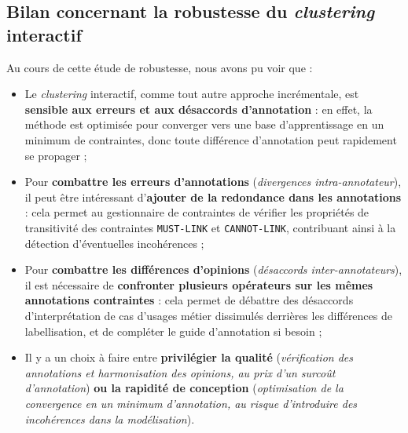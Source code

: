	
	\subsection{Bilan concernant la robustesse du \textit{clustering} interactif}
	\label{section:4.6.4-ETUDE-ROBUSTESSE-MISE-EN-COMMUN}
	
		\begin{leftBarSummary}
			Au cours de cette étude de robustesse, nous avons pu voir que :
			\begin{itemize}
				\item[\itemok] Le \textit{clustering} interactif, comme tout autre approche incrémentale, est \textbf{sensible aux erreurs et aux désaccords d'annotation} : en effet, la méthode est optimisée pour converger vers une base d'apprentissage en un minimum de contraintes, donc toute différence d'annotation peut rapidement se propager ;
				\item[\itemok] Pour \textbf{combattre les erreurs d'annotations} (\textit{divergences intra-annotateur}), il peut être intéressant d'\textbf{ajouter de la redondance dans les annotations} : cela permet au gestionnaire de contraintes de vérifier les propriétés de transitivité des contraintes \texttt{MUST-LINK} et \texttt{CANNOT-LINK}, contribuant ainsi à la détection d'éventuelles incohérences ;
				\item[\itemok] Pour \textbf{combattre les différences d'opinions} (\textit{désaccords inter-annotateurs}), il est nécessaire de \textbf{confronter plusieurs opérateurs sur les mêmes annotations contraintes} : cela permet de débattre des désaccords d'interprétation de cas d'usages métier dissimulés derrières les différences de labellisation, et de compléter le guide d'annotation si besoin ;
				\item[\itemok] Il y a un choix à faire entre \textbf{privilégier la qualité} (\textit{vérification des annotations et harmonisation des opinions, au prix d'un surcoût d'annotation}) \textbf{ou la rapidité de conception} (\textit{optimisation de la convergence en un minimum d'annotation, au risque d'introduire des incohérences dans la modélisation}).
			\end{itemize}
		\end{leftBarSummary}